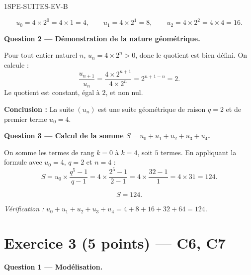 \begin{corrige}{1SPE-SUITES-EV-B}

\[
  u_0 = 4 \times 2^0 = 4 \times 1 = 4, \qquad
  u_1 = 4 \times 2^1 = 8, \qquad
  u_2 = 4 \times 2^2 = 4 \times 4 = 16.
\]

\medskip
\textbf{Question 2 — Démonstration de la nature géométrique.}


Pour tout entier naturel $n$, $u_n = 4 \times 2^n > 0$, donc le quotient est bien défini. On calcule :
\[
  \frac{u_{n+1}}{u_n} = \frac{4 \times 2^{n+1}}{4 \times 2^n} = 2^{n+1-n} = 2.
\]
Le quotient est constant, égal à $2$, et non nul.

\textbf{Conclusion :} La suite $(u_n)$ est une suite géométrique de raison $q = 2$ et de premier terme $u_0 = 4$.

\medskip
\textbf{Question 3 — Calcul de la somme $S = u_0 + u_1 + u_2 + u_3 + u_4$.}


On somme les termes de rang $k = 0$ à $k = 4$, soit $5$ termes. En appliquant la formule avec $u_0 = 4$, $q = 2$ et $n = 4$ :
\[
  S = u_0 \times \frac{q^5 - 1}{q - 1} = 4 \times \frac{2^5 - 1}{2 - 1} = 4 \times \frac{32 - 1}{1} = 4 \times 31 = 124.
\]

\[
  \boxed{S = 124.}
\]

\textit{Vérification :} $u_0 + u_1 + u_2 + u_3 + u_4 = 4 + 8 + 16 + 32 + 64 = 124$. \checkmark

\section*{Exercice 3 \hfill (5 points) — C6, C7}


\bigskip
\textbf{Question 1 — Modélisation.}



\end{corrige}
